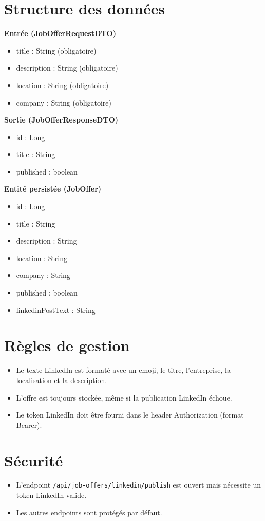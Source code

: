 \documentclass[a4paper,12pt]{report}
\begin{document}
\section{Structure des données}
\textbf{Entrée (JobOfferRequestDTO)}
\begin{itemize}[leftmargin=*]
    \item title : String (obligatoire)
    \item description : String (obligatoire)
    \item location : String (obligatoire)
    \item company : String (obligatoire)
\end{itemize}

\textbf{Sortie (JobOfferResponseDTO)}
\begin{itemize}[leftmargin=*]
    \item id : Long
    \item title : String
    \item published : boolean
\end{itemize}

\textbf{Entité persistée (JobOffer)}
\begin{itemize}[leftmargin=*]
    \item id : Long
    \item title : String
    \item description : String
    \item location : String
    \item company : String
    \item published : boolean
    \item linkedinPostText : String
\end{itemize}

\section{Règles de gestion}
\begin{itemize}[leftmargin=*]
    \item Le texte LinkedIn est formaté avec un emoji, le titre, l'entreprise, la localisation et la description.
    \item L'offre est toujours stockée, même si la publication LinkedIn échoue.
    \item Le token LinkedIn doit être fourni dans le header Authorization (format Bearer).
\end{itemize}

\section{Sécurité}
\begin{itemize}[leftmargin=*]
    \item L'endpoint \texttt{/api/job-offers/linkedin/publish} est ouvert mais nécessite un token LinkedIn valide.
    \item Les autres endpoints sont protégés par défaut.
\end{itemize}
\end{document}
